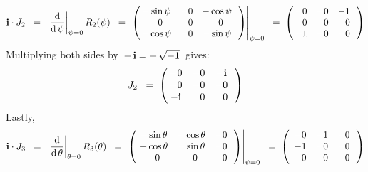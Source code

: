 \begin{equation*}
\i \cdot J_{2}
\;\; = \;\;
	\left.\dfrac{\d}{\d\,\psi}\right\vert_{\psi = 0} R_{2}(\psi)
\;\; = \;
	\left.\left(\!\!
		\begin{array}{ccc}
			{\color{white}-}\sin\psi & {\color{white}-}0 & {\color{black}-}\cos\psi \\
			{\color{white}-}0 & {\color{white}-}0 & {\color{white}-}0 \\
			{\color{white}-}\cos\psi & {\color{white}-}0 & {\color{white}-}\sin\psi \\
			\end{array}
		\,\right)\right\vert_{\psi = 0}
\;\; = \;
	\left(\!\!
		\begin{array}{ccc}
			{\color{white}-}0 & {\color{white}-}0 & {\color{black}-}1 \\
			{\color{white}-}0 & {\color{white}-}0 & {\color{white}-}0 \\
			{\color{white}-}1 & {\color{white}-}0 & {\color{white}-}0 \\
			\end{array}
		\,\right)
\end{equation*}
Multiplying both sides by \,$-\,\textnormal{\bf i} = -\,\sqrt{-1}$\, gives:
\begin{equation*}
J_{2}
\;\; = \;
	\left(\!\!
		\begin{array}{ccc}
			{\color{white}-}0 & {\color{white}-}0 & {\color{white}-}\i \\
			{\color{white}-}0 & {\color{white}-}0 & {\color{white}-}0 \\
			{\color{black}-}\i & {\color{white}-}0 & {\color{white}-}0 \\
			\end{array}
		\,\right)
\end{equation*}
Lastly,
\begin{equation*}
\i \cdot J_{3}
\;\; = \;\;
	\left.\dfrac{\d}{\d\,\theta}\right\vert_{\theta = 0} R_{3}(\theta)
\;\; = \;
	\left.\left(\!
		\begin{array}{ccc}
			{\color{white}-}\sin\theta & {\color{white}-}\cos\theta & {\color{white}-}0 \\
			{\color{black}-}\cos\theta & {\color{white}-}\sin\theta & {\color{white}-}0 \\
			{\color{white}-}0 & {\color{white}-}0 & {\color{white}-}0 \\
			\end{array}
		\,\right)\right\vert_{\psi = 0}
\;\; = \;
	\left(
		\begin{array}{ccc}
			{\color{white}-}0 & {\color{white}-}1 & {\color{white}-}0 \\
			{\color{black}-}1 & {\color{white}-}0 & {\color{white}-}0 \\
			{\color{white}-}0 & {\color{white}-}0 & {\color{white}-}0 \\
			\end{array}
		\,\right)
\end{equation*}
